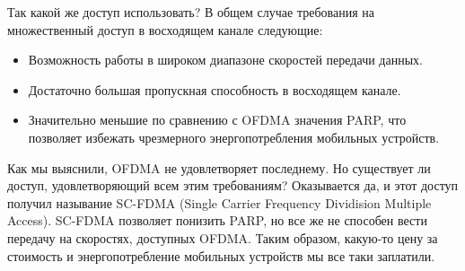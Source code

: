 \documentclass{book}
\numberwithin{theorem}{chapter}
\numberwithin{statement}{chapter}
\numberwithin{lemma}{chapter}
\theoremstyle{definition}
\numberwithin{task}{chapter}
\theoremstyle{remark}
\numberwithin{example}{chapter}
\theoremstyle{definition}
\numberwithin{definition}{chapter}
\theoremstyle{remark}
\theoremstyle{remark}
\numberwithin{lyrics}{section}
\begin{document}
Так какой же доступ использовать? В общем случае требования на множественный доступ в восходящем канале следующие:
\begin{itemize}
\item Возможность работы в широком диапазоне скоростей передачи данных.
\item Достаточно большая пропускная способность в восходящем канале.
\item Значительно меньшие по сравнению с OFDMA значения PARP, что позволяет избежать чрезмерного энергопотребления мобильных устройств.
\end{itemize}
Как мы выяснили, OFDMA не удовлетворяет последнему. Но существует ли доступ, удовлетворяющий всем этим требованиям?
Оказывается да, и этот доступ получил называние SC-FDMA (Single Carrier Frequency Dividision Multiple Access). SC-FDMA позволяет понизить PARP, но все же не способен вести передачу на скоростях, доступных OFDMA. Таким образом, какую-то цену за стоимость и энергопотребление мобильных устройств мы все таки заплатили.
\end{document}
